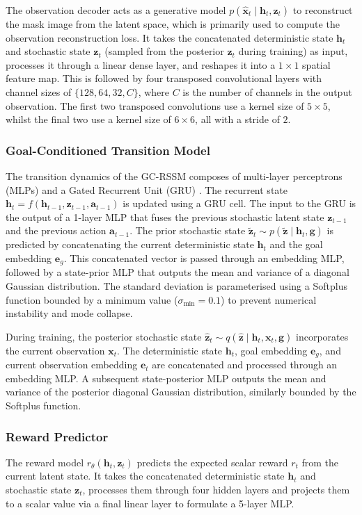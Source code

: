 \documentclass[journal]{IEEEtran}
\newcommand{\addinfo}[1]{\textcolor{myPurple}{#1}}
\begin{document}
\addinfo{The observation decoder acts as a generative model $p(\hat{\bm{x}}_t \;|\; \bm{h}_t, \bm{z}_t)$ to reconstruct the mask image from the latent space, which is primarily used to compute the observation reconstruction loss. It takes the concatenated deterministic state $\bm{h}_t$ and stochastic state $\bm{z}_t$ (sampled from the posterior $\hat{\bm{z}}_t$ during training) as input, processes it through a linear dense layer, and reshapes it into a $1 \times 1$ spatial feature map. This is followed by four transposed convolutional layers with channel sizes of $\{128, 64, 32, C\}$, where $C$ is the number of channels in the output observation. The first two transposed convolutions use a kernel size of $5 \times 5$, whilst the final two use a kernel size of $6 \times 6$, all with a stride of $2$.}

\subsubsection{Goal-Conditioned Transition Model} \addinfo{The transition dynamics of the GC-RSSM composes of multi-layer perceptrons (MLPs) and a Gated Recurrent Unit (GRU) \cite{cho2014properties}. The recurrent state $\bm{h}_t = f(\bm{h}_{t-1}, \bm{z}_{t-1}, \bm{a}_{t-1})$ is updated using a GRU cell. The input to the GRU is the output of a 1-layer MLP that fuses the previous stochastic latent state $\bm{z}_{t-1}$ and the previous action $\bm{a}_{t-1}$. The prior stochastic state $\tilde{\bm{z}}_t \sim p(\tilde{\bm{z}} \;|\; \bm{h}_t, \bm{g})$ is predicted by concatenating the current deterministic state $\bm{h}_t$ and the goal embedding $\bm{e}_g$. This concatenated vector is passed through an embedding MLP, followed by a state-prior MLP that outputs the mean and variance of a diagonal Gaussian distribution. The standard deviation is parameterised using a Softplus function bounded by a minimum value ($\sigma_{\text{min}} = 0.1$) to prevent numerical instability and mode collapse.}

\addinfo{During training, the posterior stochastic state $\hat{\bm{z}}_t \sim q(\hat{\bm{z}} \;|\; \bm{h}_t, \bm{x}_t, \bm{g})$ incorporates the current observation $\bm{x}_t$. The deterministic state $\bm{h}_t$, goal embedding $\bm{e}_g$, and current observation embedding $\bm{e}_t$ are concatenated and processed through an embedding MLP. A subsequent state-posterior MLP outputs the mean and variance of the posterior diagonal Gaussian distribution, similarly bounded by the Softplus function.}

\subsubsection{Reward Predictor} \addinfo{The reward model $r_\theta(\bm{h}_t, \bm{z}_t)$ predicts the expected scalar reward $r_t$ from the current latent state. It takes the concatenated deterministic state $\bm{h}_t$ and stochastic state $\bm{z}_t$, processes them through four hidden layers and projects them to a scalar value via a final linear layer to formulate a 5-layer MLP.}
\end{document}
